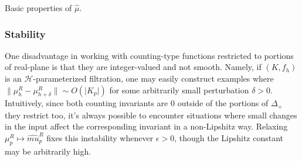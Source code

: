 \documentclass[12pt]{article}
\numberwithin{equation}{section}
\newcommand{\+}{%
	\raisebox{0.18ex}{\scaleobj{0.55}{+}}
}
\theoremstyle{definition}
\begin{document}
Basic properties of $\hat{\mu}$. %



\subsubsection*{Stability}
One disadvantage in working with counting-type functions restricted to portions of real-plane is that they are integer-valued and not smooth. 
Namely, if $(K, f_h)$ is an $\mathcal{H}$-parameterized filtration, one may easily construct examples where $\lVert \mu_h^R - \mu_{h + \delta}^R \rVert \sim O(\lvert K_p \rvert )$ for some arbitrarily small perturbation $\delta > 0$. 
Intuitively, since both counting invariants are $0$ outside of the portions of $\Delta_+$ they restrict  too, it's always possible to encounter situations where small changes in the input affect the corresponding invariant in a non-Lipshitz way. 
Relaxing $\mu_p^R \mapsto \hat{mu}_p^R$ fixes this instability whenever $\epsilon > 0$, though the Lipshitz constant may be arbitrarily high.  
\end{document}
